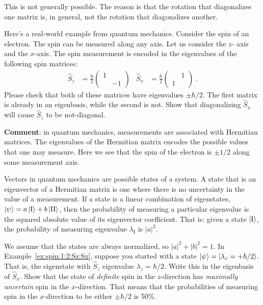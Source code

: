 \documentclass[12pt, oneside]{report}    %
\begin{document}
This is not generally possible. The reason is that the rotation that diagonalizes one matrix is, in general, not the rotation that diagonalizes another. 

\begin{exercise}\label{ex:spin:1:2:Sz:Sx}
Here's a real-world example from quantum mechanics. Consider the spin of an electron. The spin can be measured along any axis. Let us consider the $z$- axis and the $x$-axis. The spin measurement is encoded in the eigenvalues of the following spin matrices:
\begin{align}
    \hat S_z &= \frac{\hbar}{2}
    \begin{pmatrix}
    1 & \\ 
    & -1     
    \end{pmatrix}
    &
    \hat S_x &= \frac{\hbar}{2}
    \begin{pmatrix}
     & 1\\ 
    1 &    
    \end{pmatrix} \ .
\end{align}
Please check that both of these matrices have eigenvalues $\pm \hbar/2$. The first matrix is already in an eigenbasis, while the second is not. Show that diagonalizing $\hat S_x$ will cause $\hat S_z$ to be not-diagonal.  

\textbf{Comment}: in quantum mechanics, measurements are associated with Hermitian matrices. The eigenvalues of the Hermitian matrix  encodes the possible values that one may measure. Here we see that the spin of the electron is $\pm 1/2$ along some measurement axis. 
\end{exercise}

\begin{exercise}\label{ex:spin:1:2:Sz:Sx:prob}
Vectors in quantum mechanics are possible states of a system. A state that is an eigenvector of a Hermitian matrix is one where there is no uncertainty in the value of a measurement. If a state is a linear combination of eigenstates, $\left|\psi\right\rangle = a \left|\textnormal{I}\right\rangle+b\left|\textnormal{II}\right\rangle$, then the probability of measuring a particular eigenvalue is the squared absolute value of its eigenvector coefficient. That is: given a state $\left|\textnormal{I}\right\rangle$, the probability of measuring eigenvalue $\lambda_\text{I}$ is $|a|^2$. 

We assume that the states are always normalized, so $|a|^2 + |b|^2 = 1$. In Example~\ref{ex:spin:1:2:Sz:Sx}, suppose you started with a state $\left|\psi\right\rangle = \left|\lambda_z = +\hbar/2\right\rangle$. That is, the eigenstate with $\hat S_z$ eigenvalue $\lambda_z = \hbar/2$. Write this in the eigenbasis of $\hat S_x$. Show that the state of \emph{definite} spin in the $z$-direction has \emph{maximally uncertain} spin in the $x$-direction. That means that the probabilities of measuring spin in the $x$-direction to be either $\pm\hbar/2$ is 50\%. 
\end{exercise}
\end{document}
